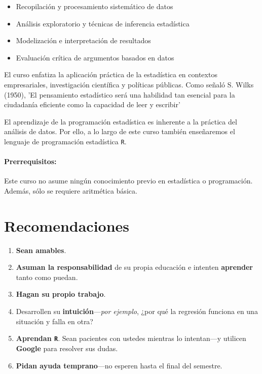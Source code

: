 \documentclass[10pt]{article}
\begin{document}
	\begin{itemize}
		\item Recopilación y procesamiento sistemático de datos
		\item Análisis exploratorio y técnicas de inferencia estadística
		\item Modelización e interpretación de resultados
		\item Evaluación crítica de argumentos basados en datos
	\end{itemize}
	
	
	El curso enfatiza la aplicación práctica de la estadística en contextos empresariales, investigación científica y políticas públicas. Como señaló S. Wilks (1950), 'El pensamiento estadístico será una habilidad tan esencial para la ciudadanía eficiente como la capacidad de leer y escribir'
	
	El aprendizaje de la programación estadística es inherente a la práctica del análisis de datos. Por ello, a lo largo de este curso también enseñaremos el lenguaje de programación estadística \texttt{{R}}.
	
	\paragraph{Prerrequisitos:} Este curso no asume ningún conocimiento previo en estadística o programación. Además, sólo se requiere aritmética básica.
	
	
	\section*{Recomendaciones}
	
	\begin{enumerate}
		\item \textbf{Sean amables}.
		\item \textbf{Asuman la responsabilidad} de su propia educación e intenten \textbf{aprender} tanto como puedan.
		\item \textbf{Hagan su propio trabajo}.
		\item Desarrollen su \textbf{intuición}---\textit{por ejemplo}, ¿por qué la regresión funciona en una situación y falla en otra?
		\item \textbf{Aprendan \texttt{R}}. Sean pacientes con ustedes mientras lo intentan---y utilicen \textbf{Google} para resolver sus dudas.
		\item \textbf{Pidan ayuda temprano}---no esperen hasta el final del semestre.
	\end{enumerate}
	
\end{document}
